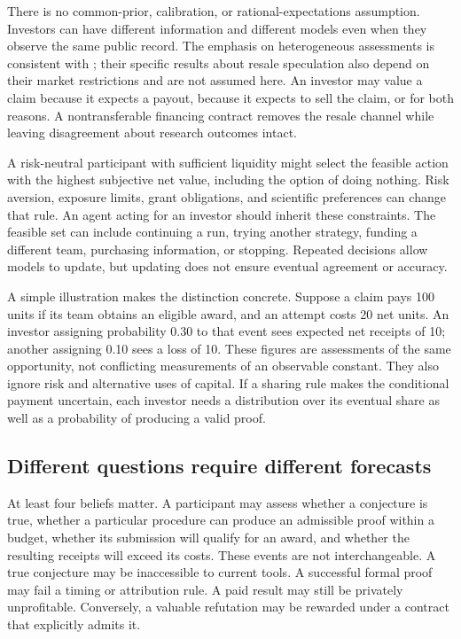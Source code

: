 \documentclass[11pt,a4paper]{article}
\begin{document}
There is no common-prior, calibration, or rational-expectations assumption. Investors can have different information and different models even when they observe the same public record. The emphasis on heterogeneous assessments is consistent with \citet{harrison}; their specific results about resale speculation also depend on their market restrictions and are not assumed here. An investor may value a claim because it expects a payout, because it expects to sell the claim, or for both reasons. A nontransferable financing contract removes the resale channel while leaving disagreement about research outcomes intact.

A risk-neutral participant with sufficient liquidity might select the feasible action with the highest subjective net value, including the option of doing nothing. Risk aversion, exposure limits, grant obligations, and scientific preferences can change that rule. An agent acting for an investor should inherit these constraints. The feasible set can include continuing a run, trying another strategy, funding a different team, purchasing information, or stopping. Repeated decisions allow models to update, but updating does not ensure eventual agreement or accuracy.

A simple illustration makes the distinction concrete. Suppose a claim pays 100 units if its team obtains an eligible award, and an attempt costs 20 net units. An investor assigning probability 0.30 to that event sees expected net receipts of 10; another assigning 0.10 sees a loss of 10. These figures are assessments of the same opportunity, not conflicting measurements of an observable constant. They also ignore risk and alternative uses of capital. If a sharing rule makes the conditional payment uncertain, each investor needs a distribution over its eventual share as well as a probability of producing a valid proof.

\subsection{Different questions require different forecasts}
At least four beliefs matter. A participant may assess whether a conjecture is true, whether a particular procedure can produce an admissible proof within a budget, whether its submission will qualify for an award, and whether the resulting receipts will exceed its costs. These events are not interchangeable. A true conjecture may be inaccessible to current tools. A successful formal proof may fail a timing or attribution rule. A paid result may still be privately unprofitable. Conversely, a valuable refutation may be rewarded under a contract that explicitly admits it.
\end{document}
